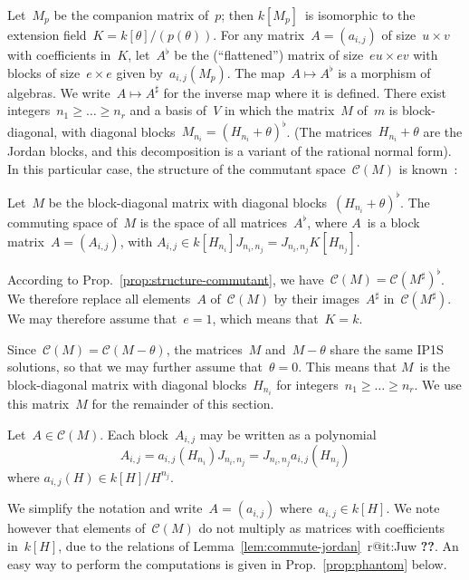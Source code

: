 \documentclass{article}%
\makeatletter
\def\labelenumi{(\roman{enumi})}
\def\itemref#1{\expandafter\ifx\csname r@#1\endcsname\relax
  {\bfseries ??}\else{\setcounter{enumi}{\ref{#1}}\labelenumi}\fi}
\let\ro\mathscr
\makeatother
\begin{document}
Let~$M_p$ be the companion matrix of~$p$; then $k[M_p]$~is isomorphic to
the extension field~$K = k[θ]/(p(θ))$.
For any matrix~$A = (a_{i,j})$ of size~$u × v$ with
coefficients in~$K$, let~$A^{♭}$ be the (``flattened'') matrix of
size~$eu × ev$ with blocks of size~$e × e$ given by~$a_{i,j}(M_p)$.
The map~$A ↦ A^{♭}$ is a morphism of algebras.
We write~$A ↦ A^{♯}$ for the inverse map where it is defined.
There exist integers~$n_1 ≥ … ≥ n_r$ and a basis
of~$V$ in which the matrix~$M$ of~$m$ is block-diagonal, with diagonal
blocks~$M_{n_i} = (H_{n_i} + θ)^{♭}$. (The matrices~$H_{n_i} + θ$ are the
Jordan blocks, and this decomposition is a variant of the rational normal
form). In this particular case, the
structure of the commutant space~$\ro C(M)$ is known~\cite[VIII, §1,
Theorem~1]{Gantmacher}:

\begin{prop}\label{prop:structure-commutant}%
Let~$M$ be the block-diagonal matrix with diagonal blocks~$(H_{n_i} +
θ)^{♭}$. The commuting space of~$M$ is the space of all matrices~$A^{♭}$,
where $A$~is a block matrix~$A = (A_{i,j})$, with $A_{i,j} ∈
 k[H_{n_i}] J_{n_{i}, n_{j}} = J_{n_i, n_j} K[H_{n_j}]$.
\end{prop}

According to Prop.~\ref{prop:structure-commutant}, we have~$\ro C(M) =
\ro C(M^{♯})^{♭}$. We therefore replace all
elements~$A$ of~$\ro C(M)$ by their images~$A^{♯}$ in~$\ro C(M^{♯})$. We
may therefore assume that~$e = 1$, which means that~$K = k$.

Since~$\ro C(M) = \ro C(M-θ)$, the matrices~$M$ and~$M - θ$ share the
same IP1S solutions, so that we may further assume that~$θ = 0$.
This means that $M$~is the block-diagonal matrix with diagonal
blocks~$H_{n_i}$ for integers~$n_1 ≥ … ≥ n_r$. We use this matrix~$M$ for
the remainder of this section.

Let~$A ∈ \ro C(M)$. Each block~$A_{i,j}$ may be written as a polynomial
\begin{equation}
A_{i,j} = a_{i,j} (H_{n_i}) J_{n_i,n_j} = J_{n_i,n_j} a_{i,j} (H_{n_j})
\end{equation}
where $a_{i,j}(H) ∈ k[H]/H^{n_j}$.

We simplify the notation and write~$A = (a_{i,j})$ where~$a_{i,j} ∈
k[H]$. We note however that elements of~$\ro C(M)$ do not multiply as
matrices with coefficients in~$k[H]$, due to the relations
of Lemma~\ref{lem:commute-jordan}~\itemref{it:Juw}.
An easy way to perform the computations is
given in Prop.~\ref{prop:phantom} below.
\end{document}
